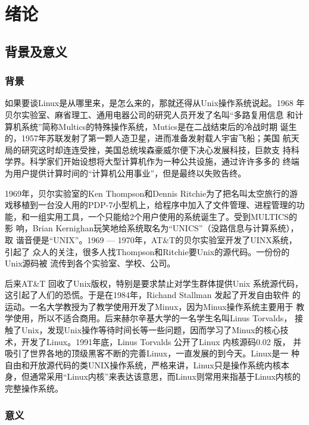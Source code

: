 \chapter{绪论}
\section{背景及意义}
\label{sec:env}

\subsection{背景}
如果要谈Linux是从哪里来，是怎么来的，那就还得从Unix操作系统说起。1968
年贝尔实验室、麻省理工、通用电器公司的研究人员开发了名叫“多路复用信息
和计算机系统”简称Multics的特殊操作系统，Mutics是在二战结束后的冷战时期
诞生的，1957年苏联发射了第一颗人造卫星，进而准备发射载人宇宙飞船；美国
航天局的研究这时却连连受挫，美国总统埃森豪威尔便下决心发展科技，巨款支
持科学界。科学家们开始设想将大型计算机作为一种公共设施，通过许许多多的
终端为用户提供计算时间的“计算机公用事业”，但是最终以失败告终。

1969年，贝尔实验室的Ken Thompson和Dennis Ritchie为了把名叫太空旅行的游
戏移植到一台没人用的PDP-7小型机上，给程序中加入了文件管理、进程管理的功
能，和一组实用工具，一个只能给2个用户使用的系统诞生了。受到MULTICS的影
响，Brian Kernighan玩笑地给系统取名为“UNICS”（没路信息与计算系统），取
谐音便是“UNIX”。1969 --- 1970年，AT\&T的贝尔实验室开发了UINX系统，引起了
众人的关注，很多人找Thompson和Ritchie要Unix的源代码。一份份的Unix源码被
流传到各个实验室、学校、公司。

后来AT\&T 回收了Unix版权，特别是要求禁止对学生群体提供Unix 系统源代码，
这引起了人们的恐慌。于是在1984年，Richand Stallman 发起了开发自由软件
的运动。一名大学教授为了教学使用开发了Minux，因为Minux操作系统主要用于
教学使用，所以不适合商用。后来赫尔辛基大学的一名学生名叫Linus Torvalds，
接触了Unix，发现Unix操作等待时间长等一些问题，因而学习了Minux的核心技
术，开发了Linux。1991年底，Linus Torvalds 公开了Linux 内核源码0.02 版，
并吸引了世界各地的顶级黑客不断的完善Linux，一直发展的到今天。Linux是一
种自由和开放源代码的类UNIX操作系统，严格来讲，Linux只是操作系统内核本
身，但通常采用“Linux内核”来表达该意思，而Linux则常用来指基于Linux内核的完整操作系统。

\subsection{意义}


